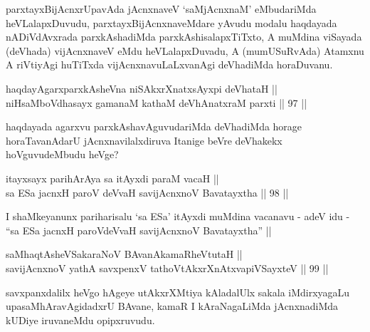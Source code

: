 \begin{artha}
\footnotemark[2]parxtayxBijAcnxrUpavAda jAcnxnaveV `saMjAcnxnaM' eMbudariMda
heVLalapxDuvudu, parxtayxBijAcnxnaveMdare yAvudu modalu haqdayada
nADiVdAvxrada parxkAshadiMda parxkAshisalapxTiTxto, A muMdina viSayada
(deVhada) vijAcnxnaveV eMdu heVLalapxDuvadu, A (mumUSuRvAda) Atamxnu A
riVtiyAgi huTiTxda vijAcnxnavuLaLxvanAgi deVhadiMda horaDuvanu.
\end{artha}


\begin{shl}
haqdayAgarxparxkAsheVna niSAkxrXnatxsAyxpi deVhataH || \\
niHsaMboVdhasayx gamanaM kathaM deVhAnatxraM parxti \hfill || 97 || 
\end{shl}

\begin{artha}
haqdayada agarxvu parxkAshavAguvudariMda deVhadiMda horage
horaTavanAdarU jAcnxnavilalxdiruva Itanige beVre deVhakekx
hoVguvudeMbudu heVge?
\end{artha}


\begin{shl}
itayxsayx parihArAya sa itAyxdi paraM vacaH || \\
sa ESa jacnxH paroV deVvaH savijAcnxnoV Bavatayxtha \hfill || 98 ||  
\end{shl}

\begin{artha}
I shaMkeyanunx pariharisalu `sa ESa' itAyxdi muMdina vacanavu - adeV
idu - ``sa ESa jacnxH paroVdeVvaH savijAcnxnoV Bavatayxtha'' || 
\end{artha}


\begin{shl}
saMhaqtAsheVSakaraNoV BAvanAkamaRheVtutaH || \\
savijAcnxnoV yathA savxpenxV tathoVtAkxrXnAtxvapiVSayxteV \hfill || 99 ||  
\end{shl}

\begin{artha}
savxpanxdalilx heVgo hAgeye utAkxrXMtiya kAladalUlx sakala
iMdirxyagaLu upasaMhAravAgidadxrU BAvane, kamaR I kAraNagaLiMda
jAcnxnadiMda kUDiye iruvaneMdu opipxruvudu.
\end{artha}


